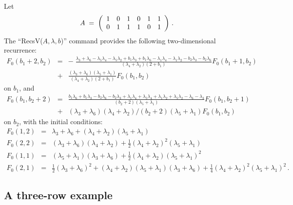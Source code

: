 \documentclass[11pt]{article}
\newcommand{\be}[1]{\begin{equation}\label{#1}}
\newcommand{\ee}{\end{equation}}
\newcommand{\beqn}{\begin{eqnarray*}}
\newcommand{\eeqn}{\end{eqnarray*}}
\newcommand{\oneh}{\frac{1}{2}}
\newcommand{\oneq}{\frac{1}{4}}
\newcommand{\mypmatrix}[1]{\left(\begin{array}{cccccccccccc}#1\end{array}\right)}
\begin{document}
Let
\be{eqn:AGoul}
A\;=\;\mypmatrix{1 & 0 & 1 & 0& 1 & 1\cr
          0& 1 & 1 & 1 & 0 & 1}\,.
\ee
The ``RecsV($A, \lambda , b$)'' command provides the following two-dimensional
recurrence:
\beqn
F_0(b_1+2, b_2)
&=&
-\;
\frac{\lambda _3+\lambda _6-\lambda _5\lambda _4-\lambda _5\lambda _2+b_1\lambda _3+b_1\lambda _6-\lambda _1\lambda _4-\lambda _1\lambda _2-b_2\lambda _3-b_2\lambda _6}{(\lambda _4+\lambda _2)(2+b_1)}
F_0(b_1+1,b_2)
\\
&+&
\frac{(\lambda _3+\lambda _6)(\lambda _5+\lambda _1)}{(\lambda _4+\lambda _2)(2+b_1)}
F_0(b_1,b_2)
\eeqn
on $b_1$, and
\beqn
F_0(b_1, b_2+2)
&=&
\frac{b_1\lambda _6+b_1\lambda _3-b_2\lambda _6-b_2\lambda _3+\lambda _1\lambda _4+\lambda _5\lambda _4+\lambda _1\lambda _2+\lambda _5\lambda _2-\lambda _6-\lambda _3}{(b_2+2)(\lambda _5+\lambda _1)}
F_0(b_1, b_2+1)
\\
&+&
(\lambda _3+\lambda _6)(\lambda _4+\lambda _2)/(b_2+2)(\lambda _5+\lambda _1)
F_0(b_1, b_2)
\eeqn
on $b_2$, 
with the initial conditions:
\beqn
F_0(1,2) &=&\lambda _3+\lambda _6+(\lambda _4+\lambda _2)(\lambda _5+\lambda _1) 
\\
F_0(2,2) &=&(\lambda _3+\lambda _6)(\lambda _4+\lambda _2)+\oneh(\lambda _4+\lambda _2)^2(\lambda _5+\lambda _1)
\\
F_0(1,1) &=&(\lambda _5+\lambda _1)(\lambda _3+\lambda _6)+\oneh(\lambda _4+\lambda _2)(\lambda _5+\lambda _1)^2 
\\
F_0(2,1) &=&\oneh(\lambda _3+\lambda _6)^2+(\lambda _4+\lambda _2)(\lambda _5+\lambda _1)(\lambda _3+\lambda _6)+\oneq(\lambda _4+\lambda _2)^2(\lambda _5+\lambda _1)^2\,.
\eeqn


\subsection{A three-row example}
\end{document}
